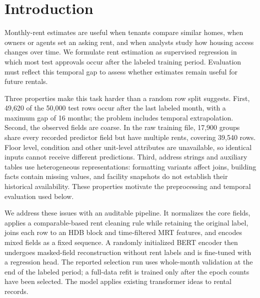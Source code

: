 \section{Introduction}\label{sec:introduction}
Monthly-rent estimates are useful when tenants compare similar homes, when owners or agents set an asking rent, and when analysts study how housing access changes over time.  We formulate rent estimation as supervised regression in which most test approvals occur after the labeled training period.  Evaluation must reflect this temporal gap to assess whether estimates remain useful for future rentals.

Three properties make this task harder than a random row split suggests.  First, 49,620 of the 50,000 test rows occur after the last labeled month, with a maximum gap of 16 months; the problem includes temporal extrapolation.  Second, the observed fields are coarse.  In the raw training file, 17,900 groups share every recorded predictor field but have multiple rents, covering 39,540 rows.  Floor level, condition and other unit-level attributes are unavailable, so identical inputs cannot receive different predictions.  Third, address strings and auxiliary tables use heterogeneous representations: formatting variants affect joins, building facts contain missing values, and facility snapshots do not establish their historical availability.  These properties motivate the preprocessing and temporal evaluation used below.

We address these issues with an auditable pipeline.  It normalizes the core fields, applies a comparable-based rent cleaning rule while retaining the original label, joins each row to an HDB block and time-filtered MRT features, and encodes mixed fields as a fixed sequence.  A randomly initialized BERT encoder then undergoes masked-field reconstruction without rent labels and is fine-tuned with a regression head.  The reported selection run uses whole-month validation at the end of the labeled period; a full-data refit is trained only after the epoch counts have been selected.  The model applies existing transformer ideas to rental records.


